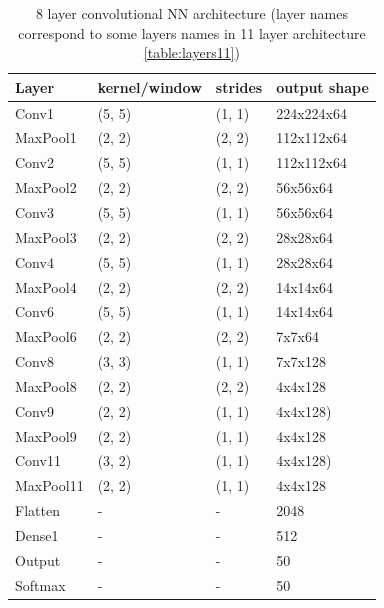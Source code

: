 \documentclass[a4paper]{article}
\begin{document}
\begin{table}[!hbt]
    \caption{ 8 layer convolutional NN architecture (layer names correspond to some layers names in 11 layer architecture \ref{table:layers11})
    \label{table:layers8}
    }
\begin{center}
    \begin{tabular}{| l | l | l | l |}
    \hline
        Layer & kernel/window& strides & output shape\\
    \hline
        Conv1  & (5, 5)&        (1, 1)&     224x224x64  \\
    \hline
        MaxPool1 & (2, 2)&      (2, 2)&     112x112x64  \\
        Conv2  & (5, 5)&        (1, 1)&     112x112x64  \\
    \hline
        MaxPool2 & (2, 2)&      (2, 2)&     56x56x64    \\
        Conv3  & (5, 5)&        (1, 1)&     56x56x64    \\
    \hline
        MaxPool3 & (2, 2)&      (2, 2)&     28x28x64    \\
        Conv4  & (5, 5)&        (1, 1)&     28x28x64  \\
    \hline
        MaxPool4 & (2, 2)&      (2, 2)&     14x14x64  \\
        Conv6  & (5, 5)&        (1, 1)&     14x14x64  \\
    \hline
        MaxPool6 & (2, 2)&      (2, 2)&     7x7x64  \\
        Conv8  & (3, 3)&        (1, 1)&     7x7x128\\
    \hline
        MaxPool8 & (2, 2)&      (2, 2)&     4x4x128  \\
        Conv9  & (2, 2)&        (1, 1)&     4x4x128)\\
    \hline
        MaxPool9 & (2, 2)&      (1, 1)&     4x4x128  \\
        Conv11 & (3, 2)&        (1, 1)&     4x4x128)\\  %
    \hline
        MaxPool11 & (2, 2)&      (1, 1)&     4x4x128  \\
        Flatten & - & - & 2048 \\
        Dense1 & - & - & 512 \\
    \hline
        Output & - & - & 50 \\
        Softmax & - & - & 50 \\
    \hline
    \end{tabular}
\end{center}
\end{table}
\end{document}
